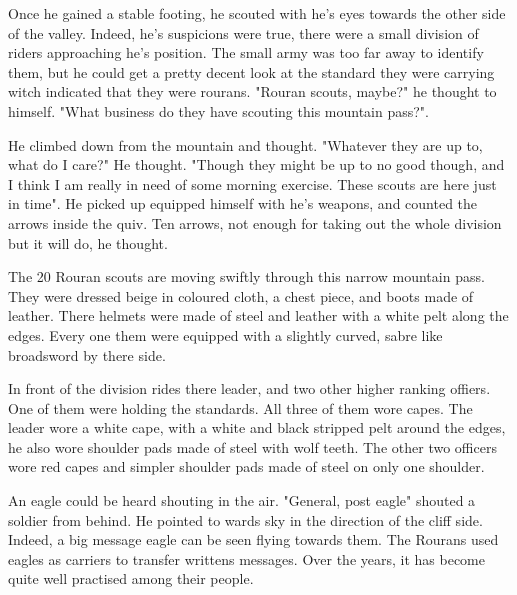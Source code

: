 Once he gained a stable footing, he scouted with he's eyes towards the other side of the valley. Indeed, he's suspicions were true, there were a small division of riders approaching he's position. The small army was too far away to identify them, but he could get a pretty decent look at the standard they were carrying witch indicated that they were rourans. "Rouran scouts, maybe?" he thought to himself. "What business do they have scouting this mountain pass?".

He climbed down from the mountain and thought. "Whatever they are up to, what do I care?" He thought. "Though they might be up to no good though, and I think I am really in need of some morning exercise. These scouts are here just in time". He picked up equipped himself with he's weapons, and counted the arrows inside the quiv. Ten arrows, not enough for taking out the whole division but it will do, he thought.

\newsect

The 20 Rouran scouts are moving swiftly through this narrow mountain pass. They were dressed beige in coloured cloth, a chest piece, and boots made of leather. There helmets were made of steel and leather with a white pelt along the edges. Every one them were equipped with a slightly curved, sabre like broadsword by there side.

In front of the division rides there leader, and two other higher ranking offiers. One of them were holding the standards. All three of them wore capes. The leader wore a white cape, with a white and black stripped pelt around the edges, he also wore shoulder pads made of steel with wolf teeth. The other two officers wore red capes and simpler shoulder pads made of steel on only one shoulder.

An eagle could be heard shouting in the air.
"General, post eagle" shouted a soldier from behind. He pointed to wards sky in the direction of the cliff side. Indeed, a big message eagle can be seen flying towards them. The Rourans used eagles as carriers to transfer writtens messages. Over the years, it has become quite well practised among their people.
